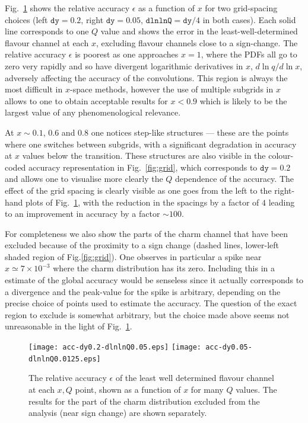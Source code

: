 \documentclass[12pt]{article}
\newcommand{\dy}{\ttt{dy}}
\newcommand{\dlnlnQ}{\ttt{dlnlnQ}}
\newcommand{\ttt}[1]{\texttt{#1}}
\begin{document}
Fig.~\ref{fig:acc-fixed-dy-dlnlnQ} shows the relative accuracy
$\epsilon$ as a function of $x$ for two grid-spacing choices (left
$\dy=0.2$, right $\dy=0.05$, $\dlnlnQ=\dy/4$ in both cases). Each
solid line corresponds to one $Q$ value and shows the error in the
least-well-determined flavour channel at each $x$, excluding flavour
channels close to a sign-change. The relative accuracy $\epsilon$
is poorest as
one approaches $x=1$, where the PDFs all go to zero very rapidly and
so have divergent logarithmic derivatives in $x$, $d\ln q/d\ln x$,
adversely affecting the accuracy of the convolutions. This region is
always the most difficult in $x$-space methods, however the use of
multiple subgrids in $x$ allows to one to obtain acceptable results
for $x<0.9$ which is likely to be the largest value of any
phenomenological relevance. 

At $x\sim0.1$, $0.6$ and $0.8$ one notices
step-like structures --- these are the points where one switches
between subgrids, with a significant degradation in accuracy at $x$
values below the transition. These structures are also visible in the
colour-coded accuracy representation in Fig.~\ref{fig:grid}, which
corresponds to $\dy=0.2$ and allows one to visualise more clearly the
$Q$ dependence of the accuracy. The effect of the grid spacing is
clearly visible as one goes from the left to the right-hand plots of
Fig.~\ref{fig:acc-fixed-dy-dlnlnQ},
with the reduction in the spacings by a factor of $4$ leading to an
improvement in accuracy by a factor $\sim 100$.



For completeness we also show the parts of the charm channel that have
been excluded because of the proximity to a sign change (dashed lines,
lower-left shaded region of Fig.\ref{fig:grid}).  One observes in
particular a spike near $x\simeq 7 \times 10^{-3}$ where the charm
distribution has its zero. Including this in a estimate of the global
accuracy would be senseless since it actually corresponds to a
divergence and the peak-value for the spike is arbitrary, depending on
the precise choice of points used to estimate the accuracy. The
question of the exact region to exclude is somewhat arbitrary, but the
choice made above seems not unreasonable in the light of
Fig.~\ref{fig:acc-fixed-dy-dlnlnQ}.

\begin{figure}
  \centering
  \texttt{[image: acc-dy0.2-dlnlnQ0.05.eps]}\hfill
  \texttt{[image: acc-dy0.05-dlnlnQ0.0125.eps]}
  \caption{The relative accuracy $\epsilon$ of the least well
    determined flavour channel at each $x, Q$ point, shown as a
    function of $x$ for many $Q$ values. The results for the part of
    the charm distribution excluded from the analysis (near sign
    change) are shown separately. }
  \label{fig:acc-fixed-dy-dlnlnQ}
\end{figure}
\end{document}
